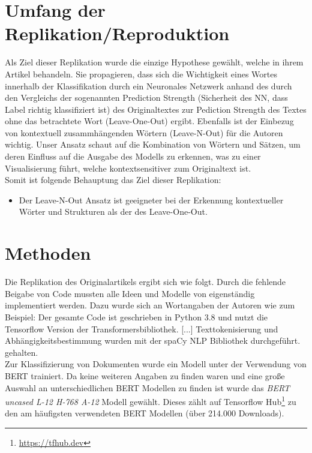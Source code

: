 \documentclass[DIV=13,fontsize=11pt]{scrartcl}
\begin{document}
\section{Umfang der Replikation/Reproduktion}

Als Ziel dieser Replikation wurde die einzige Hypothese gewählt, welche
\citeauthor{dunn2021context} in ihrem Artikel behandeln. Sie propagieren,
dass sich die Wichtigkeit eines Wortes innerhalb der Klassifikation durch ein
Neuronales Netzwerk anhand des durch den Vergleichs der sogenannten
Prediction Strength (Sicherheit des NN, dass Label richtig klassifiziert ist)
des Originaltextes zur Pediction Strength des Textes ohne das betrachtete Wort (Leave-One-Out)
ergibt. Ebenfalls ist der Einbezug von kontextuell zusammhängenden Wörtern (Leave-N-Out)
für die Autoren wichtig. \glqq Unser Ansatz schaut auf die Kombination von
Wörtern und Sätzen, um deren Einfluss auf die Ausgabe des Modells zu erkennen,
was zu einer Visualisierung führt, welche kontextsensitiver zum Originaltext ist.
\grqq~\cite{dunn2021context}\\

Somit ist folgende Behauptung das Ziel dieser Replikation:

\begin{itemize}
    \item Der Leave-N-Out Ansatz ist geeigneter bei der Erkennung kontextueller Wörter und Strukturen als der des Leave-One-Out.
\end{itemize}

\section{Methoden}

Die Replikation des Originalartikels ergibt sich wie folgt. Durch die
fehlende Beigabe von Code mussten alle Ideen und Modelle von \citeauthor{dunn2021context}
eigenständig implementiert werden. Dazu wurde sich an Wortangaben
der Autoren wie zum Beispiel:
\glqq Der gesamte Code ist geschrieben in Python 3.8 und nutzt die Tensorflow Version
der Transformersbibliothek. [...] Texttokenisierung und Abhängigkeitsbestimmung wurden
mit der spaCy NLP Bibliothek durchgeführt.\grqq~\cite{dunn2021context} gehalten.\\

Zur Klassifizierung von Dokumenten wurde ein Modell unter der Verwendung von BERT trainiert.
Da keine weiteren Angaben zu finden waren und eine große Auswahl an unterschiedlichen
BERT Modellen zu finden ist wurde das \textit{BERT uncased L-12 H-768 A-12} Modell gewählt.
Dieses zählt auf Tensorflow Hub\footnote{\url{https://tfhub.dev}} zu den am häufigsten verwendeten
BERT Modellen (über 214.000 Downloads).\\
\end{document}
